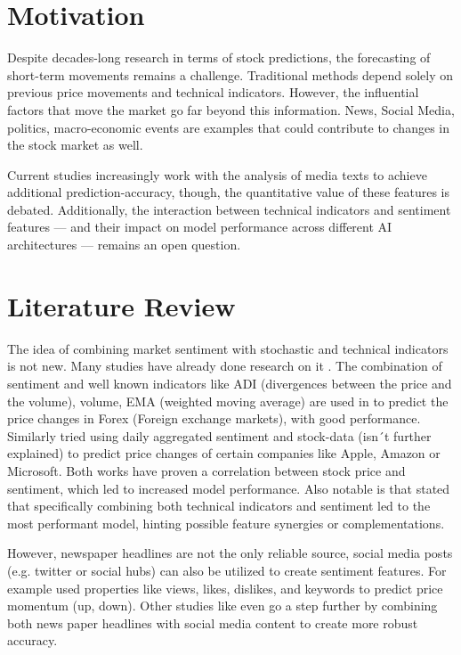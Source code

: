 \documentclass[MAI,Projekt,english,IEEE]{twbook}%
\begin{document}
\chapter{Motivation}
Despite decades-long research in terms of stock predictions, the forecasting of short-term movements remains a challenge. Traditional methods depend solely on previous price movements and technical indicators. However, the influential factors that move the market go far beyond this information. News, Social Media, politics, macro-economic events are examples that could contribute to changes in the stock market as well.

Current studies \cite{ANBAEEFARIMANI2022108742} increasingly work with the analysis of media texts to achieve additional prediction-accuracy, though, the quantitative value of these features is debated. Additionally, the interaction between technical indicators and sentiment features — and their impact on model performance across different AI architectures — remains an open question.

\chapter{Literature Review}
The idea of combining market sentiment with stochastic and technical indicators is not new. Many studies have already done research on it \cite{ANBAEEFARIMANI2022108742} \cite{10380556} \cite{9175549}. The combination of sentiment and well known indicators like ADI (divergences between the price and the volume), volume, EMA (weighted moving average) are used in \cite{ANBAEEFARIMANI2022108742} to predict the price changes in Forex (Foreign exchange markets), with good performance. Similarly \cite{9175549} tried using daily aggregated sentiment and stock-data (isn´t further explained) to predict price changes of certain companies like Apple, Amazon or Microsoft. Both works have proven a correlation between stock price and sentiment, which led to increased model performance. Also notable is that \cite{ANBAEEFARIMANI2022108742} stated that specifically combining both technical indicators and sentiment led to the most performant model, hinting possible feature synergies or complementations.

However, newspaper headlines are not the only reliable source, social media posts (e.g. twitter or social hubs) can also be utilized to create sentiment features. For example \cite{CHOI2024121589} used properties like views, likes, dislikes, and keywords to predict price momentum (up, down). Other studies like \cite{khan2022stock} even go a step further by combining both news paper headlines with social media content to create more robust accuracy.
\end{document}
